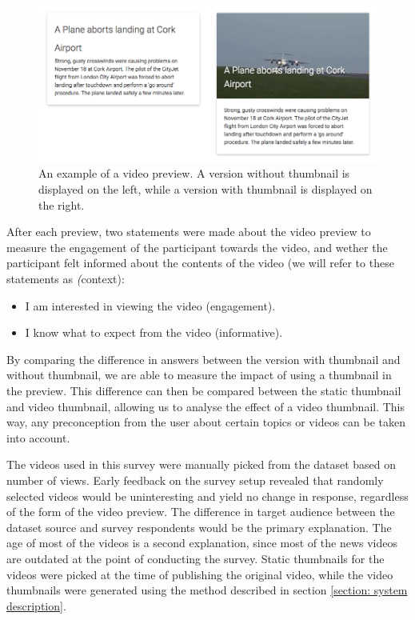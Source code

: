 \documentclass{../resources/sig-alternate-05-2015}
\begin{document}
\begin{figure}[h]
  \includegraphics[width=\linewidth]{resources/preview-combined.png}
  \caption{An example of a video preview. A version without thumbnail is displayed on the left, while a version with thumbnail is displayed on the right.}
  \label{figure: survey preview}
\end{figure}

After each preview, two statements were made about the video preview to measure the engagement of the participant towards the video, and wether the participant felt informed about the contents of the video (we will refer to these statements as \textit(context):

\begin{itemize}
	\item I am interested in viewing the video (engagement).
	\item I know what to expect from the video (informative).
\end{itemize}

By comparing the difference in answers between the version with thumbnail and without thumbnail, we are able to measure the impact of using a thumbnail in the preview. This difference can then be compared between the static thumbnail and video thumbnail, allowing us to analyse the effect of a video thumbnail. This way, any preconception from the user about certain topics or videos can be taken into account.

The videos used in this survey were manually picked from the dataset based on number of views. Early feedback on the survey setup revealed that randomly selected videos would be uninteresting and yield no change in response, regardless of the form of the video preview. The difference in target audience between the dataset source and survey respondents would be the primary explanation. The age of most of the videos is a second explanation, since most of the news videos are outdated at the point of conducting the survey. Static thumbnails for the videos were picked at the time of publishing the original video, while the video thumbnails were generated using the method described in section \ref{section: system description}.
\end{document}
